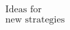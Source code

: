 \documentclass[preview]{standalone}
\begin{document}
\begin{align*}
\text{Ideas for}\\\text{new strategies}
\end{align*}
\end{document}
